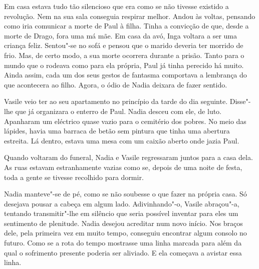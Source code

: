 Em casa estava tudo tão silencioso que era como se não tivesse existido
a revolução. Nem na sua sala conseguia respirar melhor. Andou às voltas,
pensando como iria comunicar a morte de Paul à filha. Tinha a convicção
de que, desde a morte de Drago, fora uma má mãe. Em casa da avó, Inga
voltara a ser uma criança feliz. Sentou"-se no sofá e pensou que o marido
deveria ter morrido de frio. Mas, de certo modo, a sua morte ocorrera
durante a prisão. Tanto para o mundo que o rodeava como para ela
própria, Paul já tinha perecido há muito. Ainda assim, cada um dos seus
gestos de fantasma comportava a lembrança do que acontecera ao filho.
Agora, o ódio de Nadia deixara de fazer sentido.

Vasile veio ter ao seu apartamento no princípio da tarde
do dia seguinte. Disse"-lhe que já organizara o enterro de Paul. Nadia
desceu com ele, de luto. Apanharam um eléctrico quase vazio para o
cemitério dos pobres. No meio das lápides, havia uma barraca de betão
sem pintura que tinha uma abertura estreita. Lá dentro, estava uma mesa
com um caixão aberto onde jazia Paul.

Quando voltaram do funeral, Nadia e Vasile regressaram juntos para a
casa dela. As ruas estavam estranhamente vazias como se, depois de uma noite de festa, toda a gente se
tivesse recolhido para dormir.

Nadia manteve"-se de pé, como se não soubesse o que fazer na própria
casa. Só desejava pousar a cabeça em algum lado. Adivinhando"-o, Vasile
abraçou"-a, tentando transmitir"-lhe em silêncio que seria possível
inventar para eles um sentimento de plenitude. Nadia desejou acreditar
num novo início. Nos braços dele, pela primeira vez em muito tempo,
conseguiu encontrar algum consolo no futuro. Como se a rota do tempo
mostrasse uma linha marcada para além da qual o sofrimento presente
poderia ser aliviado. E ela começava a avistar essa linha.
